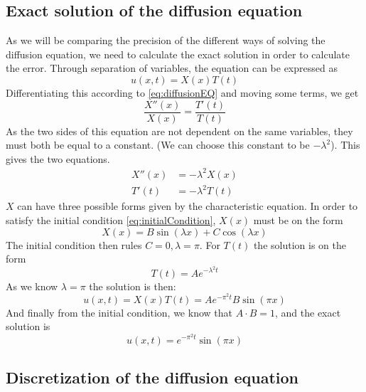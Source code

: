 \subsection{Exact solution of the diffusion equation}
As we will be comparing the precision of the different ways of solving the diffusion equation, we need to calculate the exact solution in order to calculate the error.
Through separation of variables, the equation can be expressed as
\begin{equation}
u(x,t) = X(x)T(t)
\label{eq:separated}
\end{equation}
Differentiating this according to \eqref{eq:diffusionEQ} and moving some terms, we get
\begin{equation*}
\frac{X''(x)}{X(x)} = \frac{T'(t)}{T(t)}
\end{equation*}
As the two sides of this equation are not dependent on the same variables, they must both be equal to a constant. (We can choose this constant to be $-\lambda ^2$). This gives the two equations.
\begin{equation*}
\begin{split}
X''(x) &= -\lambda ^2 X(x) \\
T'(t) &= -\lambda^2 T(t)
\end{split}
\end{equation*}
$X$ can have three possible forms given by the characteristic equation. In order to satisfy the initial condition \eqref{eq:initialCondition}, $X(x)$ must be on the form
\begin{equation*}
X(x) = B\sin(\lambda x) + C\cos(\lambda x)
\end{equation*}
The initial condition then rules $C=0, \lambda = \pi$. For $T(t)$ the solution is on the form
\begin{equation*}
T(t) = Ae^{-\lambda^2t}
\end{equation*}
As we know $\lambda =\pi$ the solution is then:
\begin{equation*}
u(x,t) = X(x)T(t) = Ae^{-\pi^2 t}B\sin(\pi x)
\end{equation*}
And finally from the initial condition, we know that $A\cdot B = 1$, and the exact solution is
\begin{equation}
u(x,t) = e^{-\pi^2 t}\sin(\pi x)
\label{eq:exact}
\end{equation}

\subsection{Discretization of the diffusion equation}


